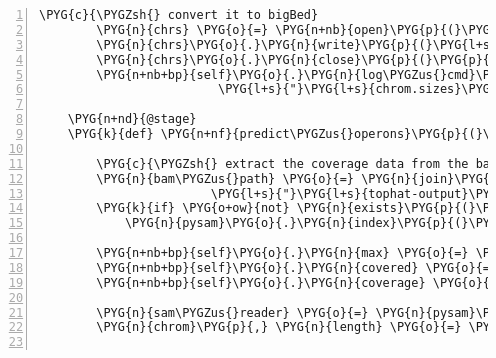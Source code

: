 \begin{Verbatim}[commandchars=\\\{\},numbers=left,firstnumber=1,stepnumber=5]
        \PYG{c}{\PYGZsh{} convert it to bigBed}
        \PYG{n}{chrs} \PYG{o}{=} \PYG{n+nb}{open}\PYG{p}{(}\PYG{l+s}{"}\PYG{l+s}{chrom.sizes}\PYG{l+s}{"}\PYG{p}{,} \PYG{l+s}{"}\PYG{l+s}{w}\PYG{l+s}{"}\PYG{p}{)}
        \PYG{n}{chrs}\PYG{o}{.}\PYG{n}{write}\PYG{p}{(}\PYG{l+s}{"}\PYG{l+s}{chr }\PYG{l+s+si}{\PYGZpc{}d}\PYG{l+s}{"} \PYG{o}{\PYGZpc{}} \PYG{n+nb}{len}\PYG{p}{(}\PYG{n+nb+bp}{self}\PYG{o}{.}\PYG{n}{genbank\PYGZus{}record}\PYG{o}{.}\PYG{n}{seq}\PYG{p}{)}\PYG{p}{)}
        \PYG{n}{chrs}\PYG{o}{.}\PYG{n}{close}\PYG{p}{(}\PYG{p}{)}
        \PYG{n+nb+bp}{self}\PYG{o}{.}\PYG{n}{log\PYGZus{}cmd}\PYG{p}{(}\PYG{l+s}{"}\PYG{l+s}{bedToBigBed}\PYG{l+s}{"}\PYG{p}{,} \PYG{l+s}{"}\PYG{l+s}{hp\PYGZus{}terminators.bed}\PYG{l+s}{"}\PYG{p}{,}
                         \PYG{l+s}{"}\PYG{l+s}{chrom.sizes}\PYG{l+s}{"}\PYG{p}{,} \PYG{l+s}{"}\PYG{l+s}{hp\PYGZus{}terminators.bigbed}\PYG{l+s}{"}\PYG{p}{)}

    \PYG{n+nd}{@stage}
    \PYG{k}{def} \PYG{n+nf}{predict\PYGZus{}operons}\PYG{p}{(}\PYG{n+nb+bp}{self}\PYG{p}{)}\PYG{p}{:}

        \PYG{c}{\PYGZsh{} extract the coverage data from the bam track created by tophat}
        \PYG{n}{bam\PYGZus{}path} \PYG{o}{=} \PYG{n}{join}\PYG{p}{(}\PYG{n}{join}\PYG{p}{(}\PYG{n+nb+bp}{self}\PYG{o}{.}\PYG{n}{analysis}\PYG{o}{.}\PYG{n}{data\PYGZus{}dir}\PYG{p}{,}
                        \PYG{l+s}{"}\PYG{l+s}{tophat-output}\PYG{l+s}{"}\PYG{p}{,} \PYG{l+s}{"}\PYG{l+s}{accepted\PYGZus{}hits.bam}\PYG{l+s}{"}\PYG{p}{)}\PYG{p}{)}
        \PYG{k}{if} \PYG{o+ow}{not} \PYG{n}{exists}\PYG{p}{(}\PYG{n}{bam\PYGZus{}path} \PYG{o}{+} \PYG{l+s}{"}\PYG{l+s}{.bai}\PYG{l+s}{"}\PYG{p}{)}\PYG{p}{:}
            \PYG{n}{pysam}\PYG{o}{.}\PYG{n}{index}\PYG{p}{(}\PYG{n}{bam\PYGZus{}file}\PYG{p}{)}

        \PYG{n+nb+bp}{self}\PYG{o}{.}\PYG{n}{max} \PYG{o}{=} \PYG{l+m+mi}{0}
        \PYG{n+nb+bp}{self}\PYG{o}{.}\PYG{n}{covered} \PYG{o}{=} \PYG{l+m+mi}{0}
        \PYG{n+nb+bp}{self}\PYG{o}{.}\PYG{n}{coverage} \PYG{o}{=} \PYG{p}{[}\PYG{l+m+mi}{0}\PYG{p}{]} \PYG{o}{*} \PYG{n+nb}{len}\PYG{p}{(}\PYG{n+nb+bp}{self}\PYG{o}{.}\PYG{n}{genbank\PYGZus{}record}\PYG{o}{.}\PYG{n}{seq}\PYG{p}{)}

        \PYG{n}{sam\PYGZus{}reader} \PYG{o}{=} \PYG{n}{pysam}\PYG{o}{.}\PYG{n}{Samfile}\PYG{p}{(}\PYG{n}{bam\PYGZus{}path}\PYG{p}{,} \PYG{l+s}{"}\PYG{l+s}{rb}\PYG{l+s}{"}\PYG{p}{)}
        \PYG{n}{chrom}\PYG{p}{,} \PYG{n}{length} \PYG{o}{=} \PYG{n}{sam\PYGZus{}reader}\PYG{o}{.}\PYG{n}{references}\PYG{p}{[}\PYG{l+m+mi}{0}\PYG{p}{]}\PYG{p}{,} \PYG{n}{sam\PYGZus{}reader}\PYG{o}{.}\PYG{n}{lengths}\PYG{p}{[}\PYG{l+m+mi}{0}\PYG{p}{]}


\end{Verbatim}
